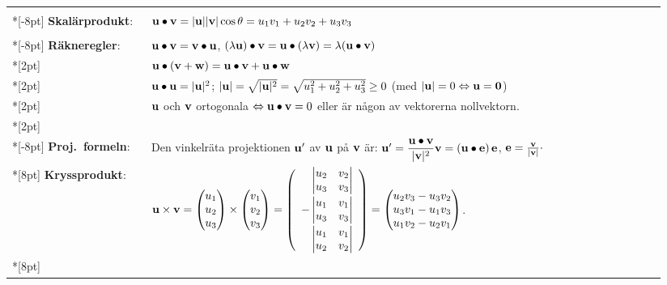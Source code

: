 \documentclass{article}
\begin{document}
\smallskip

\begin{tabular}{|p{0.2\linewidth}|p{0.745\linewidth}|}
  \hline &\\*[-8pt]
  \textbf{Skalärprodukt}:
  &
  ${\mathbf u}\bullet{\mathbf v}=|{\mathbf u}||{\mathbf v}|\cos\theta = u_1v_1+u_2v_2+u_3v_3$
  \\ &\\*[-8pt]
  \textbf{Räkneregler}:
  &
  ${\mathbf u}\bullet{\mathbf v}={\mathbf v}\bullet {\mathbf u}$, 
  $(\lambda{\mathbf u})\bullet{\mathbf v}={\mathbf u}\bullet(\lambda{\mathbf v})=\lambda({\mathbf u}\bullet{\mathbf v})$
  \\*[2pt]
  &${\mathbf u}\bullet({\mathbf v}+{\mathbf w})={\mathbf u}\bullet{\mathbf v}+{\mathbf u}\bullet{\mathbf w}$
  \\*[2pt]
  &${\mathbf u}\bullet{\mathbf u}=|{\mathbf u}|^2$;
  $|{\mathbf u}|=\sqrt{|{\mathbf u}|^2}=\sqrt{u_1^2+u_2^2+u_3^2}\ge0$ 
  (med $|{\mathbf u}|=0\Leftrightarrow{\mathbf u}=\mathbf 0$)
  \\*[2pt]
  &${\mathbf u}$ och ${\mathbf v}$ ortogonala $\Leftrightarrow{\mathbf u}\bullet{\mathbf v}=0$ eller är någon av vektorerna nollvektorn.
\\*[2pt]\hline&\\*[-8pt]
  \textbf{Proj.~formeln}:
  &
  Den vinkelräta projektionen ${\mathbf u}'$ av
  ${\mathbf u}$ på ${\mathbf v}$ är:
  ${\mathbf u}'=\dfrac{{\mathbf u}\bullet{\mathbf v}}{|{\mathbf v}|^2}{\mathbf v} = ({\mathbf u}\bullet{\mathbf e})\,{\mathbf e}$, 
  ${\mathbf e}=\frac{{\mathbf v}}{|{\mathbf v}|}\cdot$
  \\*[8pt] \hline
  \textbf{Kryssprodukt}:
  &  %
  $\bdu\times\bdv=\trevektor[u_1,u_2,u_3]\times\trevektor[v_1,v_2,v_3]
  =
  \left(\begin{array}{r}
      \begin{vmatrix}
        u_2 & v_2\\
        u_3 & v_3\\
      \end{vmatrix} 
   \\*[8pt] 
  -   \begin{vmatrix}
        u_1 & v_1\\
        u_3 & v_3\\
      \end{vmatrix} 
    \\*[8pt]
      \begin{vmatrix}
        u_1 & v_1\\
        u_2 & v_2\\
      \end{vmatrix} 
    \end{array}\right) 
  =\trevektor[u_2v_3-u_3v_2,u_3v_1-u_1v_3,u_1v_2-u_2v_1]$.
  \\*[8pt] 

\end{tabular}
\end{document}
